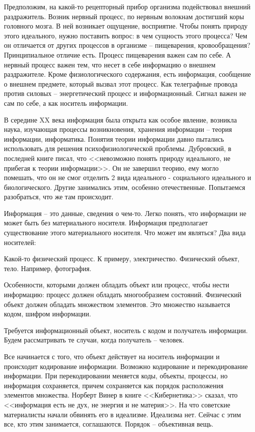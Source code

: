 Предположим, на какой-то рецепторный прибор организма подействовал внешний раздражитель. Возник нервный процесс, по нервным волокнам достигший коры головного мозга. В ней возникает ощущение, восприятие. Чтобы понять природу этого идеального, нужно поставить вопрос: в чем сущность этого процесса? Чем он отличается от других процессов в организме – пищеварения, кровообращения? Принципиальное отличие есть. Процесс пищеварения важен сам по себе. А нервный процесс важен тем, что несет в себе информацию о внешнем раздражителе. Кроме физиологического содержания, есть информация, сообщение о внешнем предмете, который вызвал этот процесс. Как телеграфные провода против силовых – энергетический процесс и информационный. Сигнал важен не сам по себе, а как носитель информации.

В середине XX века информация была открыта как особое явление, возникла наука, изучающая процессы возникновения, хранения информации – теория информации, информатика. Понятия теории информации давно пытались использовать для решения психофизиологической проблемы. Дубровский, в последней книге писал, что <<невозможно понять природу идеального, не прибегая к теории информации>>. Он не завершил теорию, ему могло помешать, что он не смог отделить 2 вида идеального - социального идеального и биологического. Другие занимались этим, особенно отечественные. Попытаемся разобраться, что же там происходит.

Информация – это данные, сведения о чем-то. Легко понять, что информации не может быть без материального носителя. Информация предполагает существование этого материального носителя. Что может им являться? Два вида носителей:

    Какой-то физический процесс. К примеру, электричество.
    Физический объект, тело. Например, фотография.

Особенности, которыми должен обладать объект или процесс, чтобы нести информацию: процесс должен обладать многообразием состояний. Физический объект должен обладать множеством элементов. Это множество называется кодом, шифром информации.

Требуется информационный объект, носитель с кодом и получатель информации. Будем рассматривать те случаи, когда получатель – человек.

Все начинается с того, что объект действует на носитель информации и происходит кодирование информации. Возможно кодирование и перекодирование информации. При перекодировании меняется коды, объекты, процессы, но информация сохраняется, причем сохраняется как порядок расположения элементов множества. Норберт Винер в книге <<Кибернетика>> сказал, что <<информация есть не дух, не энергия и не материя>>. На что советские материалисты начали обвинять его в идеализме. Идеализма нет. Сейчас с этим все, кто этим занимается, соглашаются. Порядок – объективная вещь.

